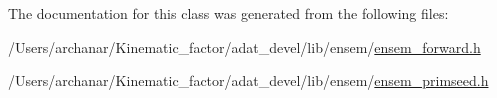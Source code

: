 The documentation for this class was generated from the following files\+:\begin{DoxyCompactItemize}
\item 
/\+Users/archanar/\+Kinematic\+\_\+factor/adat\+\_\+devel/lib/ensem/\mbox{\hyperlink{lib_2ensem_2ensem__forward_8h}{ensem\+\_\+forward.\+h}}\item 
/\+Users/archanar/\+Kinematic\+\_\+factor/adat\+\_\+devel/lib/ensem/\mbox{\hyperlink{lib_2ensem_2ensem__primseed_8h}{ensem\+\_\+primseed.\+h}}\end{DoxyCompactItemize}
